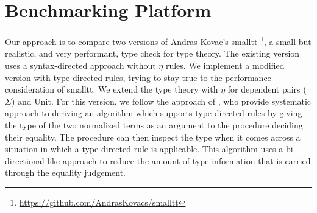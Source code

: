\section{Benchmarking Platform}
Our approach is to compare two versions of 
Andras Kovac's smalltt \footnote{\url{https://github.com/AndrasKovacs/smalltt}}, a small but realistic, and very performant, type check for type theory.
The existing version uses a syntax-directed approach without $\eta$ rules.
We implement a modified version with type-directed rules, trying to stay true to the performance consideration of smalltt.
We extend the type theory with $\eta$ for dependent pairs ($\Sigma$) and Unit.
For this version, we follow the approach of \citet{Chapman2005}, who provide systematic approach to deriving an algorithm which supports type-directed rules by giving the type of the two normalized terms as an argument to the procedure deciding their equality.
The procedure can then inspect the type when it comes across a situation in which a type-directed rule is applicable.
This algorithm uses a bi-directional-like  approach to reduce the amount of type information that is carried through the equality judgement.

% 

